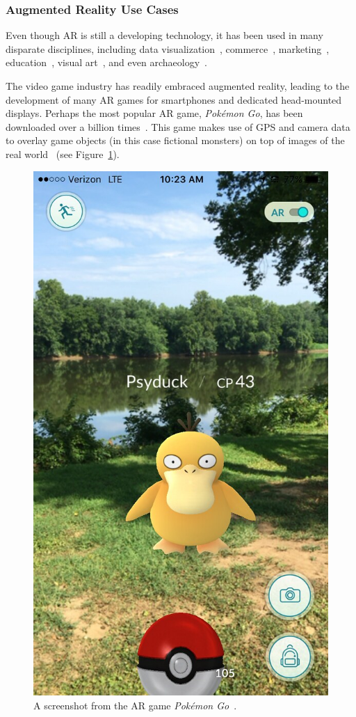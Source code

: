 \documentclass[a4paper, 10pt, american, titlepage]{article}
\begin{document}
\subsubsection{Augmented Reality Use Cases}
\label{sec:augmentedRealityUseCases}

Even though AR is still a developing technology, it has been used in many
disparate disciplines, including data visualization~\autocite{resnick2017},
commerce~\autocite{matney2018}, marketing~\autocite{sharma2015},
education~\autocite{stewart-smith2012}, visual art~\autocite{katz2018}, and
even archaeology~\autocite{eve2012}.

The video game industry has readily embraced augmented reality, leading to the
development of many AR games for smartphones and dedicated head-mounted
displays. Perhaps the most popular AR game, \textit{Pokémon Go}, has been
downloaded over a billion times~\autocite{webster2018}. This game makes use of
GPS and camera data to overlay game objects (in this case fictional monsters) on
top of images of the real world~\autocite{concepcion2016} (see
Figure~\ref{fig:pokemonGo}).

\begin{figure}[h]
	\centering
	\includegraphics[width=.5\textwidth]{pokemon-go.jpg}
	\caption[A screenshot from the AR game \textit{Pokémon Go}]{A screenshot
		from the AR game \textit{Pokémon Go}~\autocite{vastateparks2016}.}
	\label{fig:pokemonGo}
\end{figure}
\end{document}
